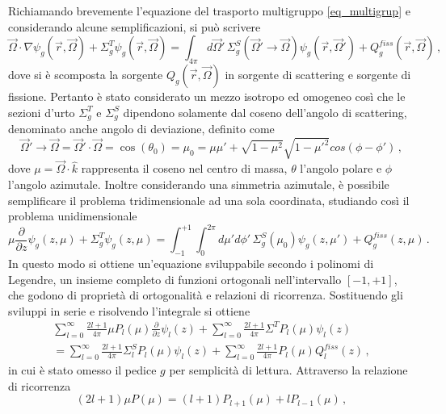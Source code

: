 Richiamando brevemente l'equazione del trasporto multigruppo \eqref{eq_multigrup} e considerando alcune semplificazioni, si può scrivere
\begin{equation}
\vec{\Omega}\cdot\nabla \psi_g(\vec{r},\vec{\Omega})+\Sigma^T_g 
\psi_g(\vec{r},\vec{\Omega}) = 
\int_{4\pi}d\vec{\Omega}'\,\Sigma_g^S(\vec{\Omega}'\rightarrow 
\vec{\Omega})\psi_g(\vec{r},\vec{\Omega}') + Q^{fiss}_g(\vec{r},\vec{\Omega}) 
\,,
\end{equation}
dove si è scomposta la sorgente $Q_g(\vec{r},\vec{\Omega})$ in sorgente di 
scattering e sorgente di fissione.
Pertanto è stato considerato un mezzo isotropo ed omogeneo così che le sezioni 
d'urto  $\Sigma_g^T$ e $\Sigma_g^S$ dipendono solamente dal coseno dell'angolo 
di scattering, denominato anche angolo di deviazione, definito come
\begin{equation}
\vec{\Omega}'\rightarrow 
\vec{\Omega}=\vec{\Omega}'\cdot\vec{\Omega}=\cos(\theta_0)=\mu_0=\mu\mu'+\sqrt{
1-\mu^2}\sqrt{1-{\mu'}^2}cos(\phi-\phi') \,,
\end{equation}
dove $\mu=\vec{\Omega}\cdot \hat{k}$ rappresenta il coseno nel centro di massa, 
$\theta$ l'angolo polare e $\phi$ l'angolo azimutale.
Inoltre considerando una simmetria azimutale, è possibile semplificare il 
problema tridimensionale ad una sola coordinata, studiando così il problema 
unidimensionale
\begin{equation}
\mu \frac{\partial}{\partial z}\psi_g(z,\mu)+\Sigma_g^T \psi_g(z,\mu) = 
\int_{-1}^{+1}\int_0^{2\pi}d\mu'd\phi'\,\Sigma_g^S(\mu_0)\psi_g(z,\mu ') 
+Q^{fiss}_g(z,\mu) \,.
\end{equation}
In questo modo si ottiene un'equazione sviluppabile secondo i polinomi di 
Legendre, un insieme completo di funzioni ortogonali nell'intervallo $[-1,+1]$, 
che godono di proprietà di ortogonalità e relazioni di ricorrenza.
Sostituendo gli sviluppi in serie e risolvendo l'integrale si ottiene
\begin{multline}
\sum_{l=0}^\infty \frac{2l+1}{4\pi}\mu P_l(\mu) \frac{\partial}{\partial 
z}\psi_l(z)+ \sum_{l=0}^\infty \frac{2l+1}{4\pi} \Sigma^T P_l(\mu)\psi_l(z)\\
=\sum_{l=0}^\infty \frac{2l+1}{4\pi}\Sigma_l^S P_l(\mu)\psi_l(z) 
+\sum_{l=0}^\infty \frac{2l+1}{4\pi} P_l(\mu)Q^{fiss}_l(z) \,,
\end{multline}
in cui è 
stato omesso il pedice $g$ per semplicità di lettura.
Attraverso la relazione di ricorrenza
\begin{equation}
(2l+1)\mu P(\mu)=(l+1)P_{l+1}(\mu)+l P_{l-1}(\mu) \,,
\end{equation}
